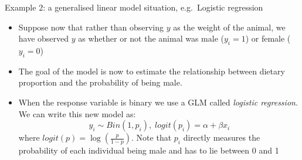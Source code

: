 \documentclass[
  ignorenonframetext,
  aspectratio=169]{beamer}
\providecommand{\tightlist}{%
  \setlength{\itemsep}{0pt}\setlength{\parskip}{0pt}}
\begin{document}
\begin{frame}{Example 2: a generalised linear model situation,
e.g.~Logistic regression}
\protect\hypertarget{example-2-a-generalised-linear-model-situation-e.g.-logistic-regression}{}
\begin{itemize}
\tightlist
\item
  Suppose now that rather than observing \(y\) as the weight of the
  animal, we have observed \(y\) as whether or not the animal was male
  (\(y_i=1\)) or female (\(y_i=0\))
\item
  The goal of the model is now to estimate the relationship between
  dietary proportion and the probability of being male.
\item
  When the response variable is binary we use a GLM called
  \emph{logistic regression}. We can write this new model as:
  \[ y_i \sim Bin(1,p_i),\; logit(p_i) = \alpha + \beta x_i\] where
  \(logit(p) = \log \left( \frac{p}{1-p} \right)\). Note that \(p_i\)
  directly measures the probability of each individual being male and
  has to lie between 0 and 1
\end{itemize}
\end{frame}
\end{document}
